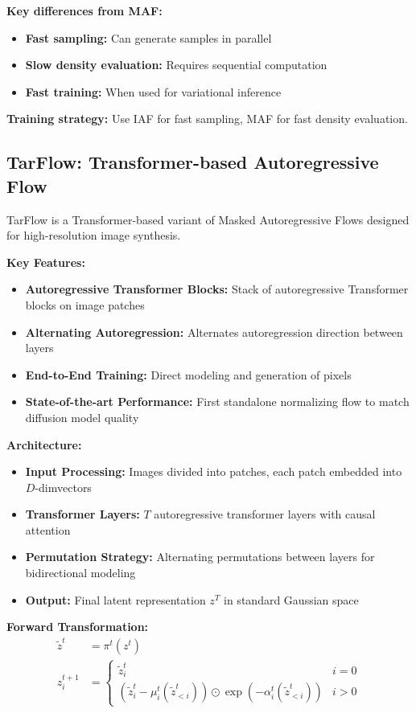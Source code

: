 \textbf{Key differences from MAF:}
\begin{itemize}
    \item \textbf{Fast sampling:} Can generate samples in parallel
    \item \textbf{Slow density evaluation:} Requires sequential computation
    \item \textbf{Fast training:} When used for variational inference
\end{itemize}

\textbf{Training strategy:} Use IAF for fast sampling, MAF for fast density evaluation.

\subsection{TarFlow: Transformer-based Autoregressive Flow}

TarFlow is a Transformer-based variant of Masked Autoregressive Flows designed for high-resolution image synthesis.

\textbf{Key Features:}
\begin{itemize}
    \item \textbf{Autoregressive Transformer Blocks:} Stack of autoregressive Transformer blocks on image patches
    \item \textbf{Alternating Autoregression:} Alternates autoregression direction between layers
    \item \textbf{End-to-End Training:} Direct modeling and generation of pixels
    \item \textbf{State-of-the-art Performance:} First standalone normalizing flow to match diffusion model quality
\end{itemize}

\textbf{Architecture:}
\begin{itemize}
    \item \textbf{Input Processing:} Images divided into patches, each patch embedded into $D$-dim\break vectors
    \item \textbf{Transformer Layers:} $T$ autoregressive transformer layers with causal attention
    \item \textbf{Permutation Strategy:} Alternating permutations between layers for bidirectional modeling
    \item \textbf{Output:} Final latent representation $z^T$ in standard Gaussian space
\end{itemize}

\textbf{Forward Transformation:}
\begin{align}
    \tilde{z}^t &= \pi^t(z^t) \\
    z_i^{t+1} &= \begin{cases}
        \tilde{z}_i^t & i = 0 \\
        (\tilde{z}_i^t - \mu_i^t(\tilde{z}_{<i}^t)) \odot \exp(-\alpha_i^t(\tilde{z}_{<i}^t)) & i > 0
    \end{cases}
\end{align}

